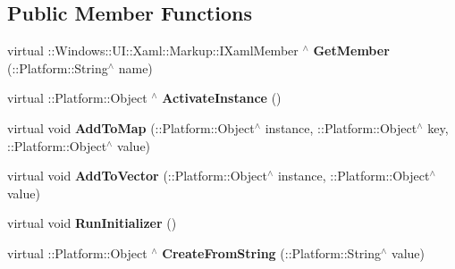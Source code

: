 \subsection*{Public Member Functions}
\begin{DoxyCompactItemize}
\item 
\mbox{\label{class_xaml_type_info_1_1_info_provider_1_1_xaml_user_type_a4c1839fa1be2287b32c86ab5d45b2af3}} 
virtual \+::Windows\+::\+U\+I\+::\+Xaml\+::\+Markup\+::\+I\+Xaml\+Member $^\wedge$ {\bfseries Get\+Member} (\+::Platform\+::\+String$^\wedge$ name)
\item 
\mbox{\label{class_xaml_type_info_1_1_info_provider_1_1_xaml_user_type_ab23d0c633fe997f65be39c9486152408}} 
virtual \+::Platform\+::\+Object $^\wedge$ {\bfseries Activate\+Instance} ()
\item 
\mbox{\label{class_xaml_type_info_1_1_info_provider_1_1_xaml_user_type_aa2d1cf0cc528940509545ebdeb61926c}} 
virtual void {\bfseries Add\+To\+Map} (\+::Platform\+::\+Object$^\wedge$ instance, \+::Platform\+::\+Object$^\wedge$ key, \+::Platform\+::\+Object$^\wedge$ value)
\item 
\mbox{\label{class_xaml_type_info_1_1_info_provider_1_1_xaml_user_type_a93b639b8ab3dd00a61776a99a0da3f54}} 
virtual void {\bfseries Add\+To\+Vector} (\+::Platform\+::\+Object$^\wedge$ instance, \+::Platform\+::\+Object$^\wedge$ value)
\item 
\mbox{\label{class_xaml_type_info_1_1_info_provider_1_1_xaml_user_type_a27ab5687ea814468d9382aa7e6502465}} 
virtual void {\bfseries Run\+Initializer} ()
\item 
\mbox{\label{class_xaml_type_info_1_1_info_provider_1_1_xaml_user_type_a7657d00c04fc9d34365f79d064227ba1}} 
virtual \+::Platform\+::\+Object $^\wedge$ {\bfseries Create\+From\+String} (\+::Platform\+::\+String$^\wedge$ value)
\item 
\mbox{\label{class_xaml_type_info_1_1_info_provider_1_1_xaml_user_type_ac876d5510485e0fd2e91b1a866c1d54d}} 

\end{DoxyCompactItemize}
